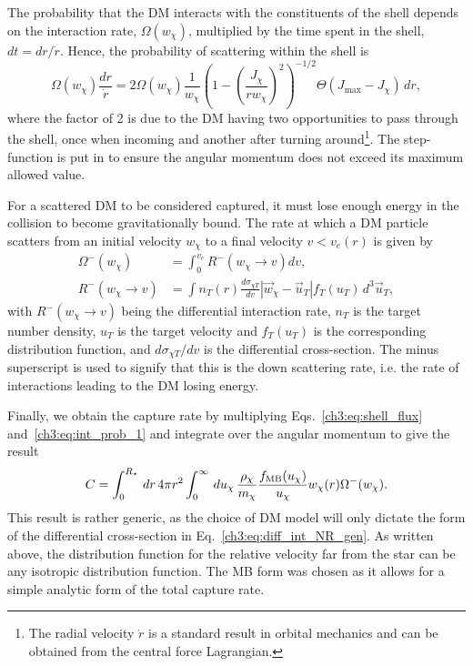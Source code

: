 The probability that the DM interacts with the constituents of the shell depends on the interaction rate, $\Omega(w_\chi)$, multiplied by the time spent in the shell, $dt = dr/\dot r$. Hence, the probability of scattering within the shell is
\begin{equation}
    \Omega(w_\chi) \frac{dr}{\dot r} = 2  \Omega(w_\chi)\frac{1}{w_\chi}\left(1 - \left(\frac{J_\chi}{r w_\chi}\right)^2 \right)^{-1/2} \Theta(J_{\mathrm{max}} - J_\chi)\,dr,\label{ch3:eq:int_prob_1}
\end{equation}
where the factor of 2 is due to the DM having two opportunities to pass through the shell, once when incoming and another after turning around\footnote{The radial velocity $\dot r$ is a standard result in orbital mechanics and can be obtained from the central force Lagrangian.}. The step-function is put in to ensure the angular momentum does not exceed its maximum allowed value. 

For a scattered DM to be considered captured, it must lose enough energy in the collision to become gravitationally bound. The rate at which a DM particle scatters from an initial velocity $w_\chi$ to a final velocity $v<v_e(r)$ is given by~\cite{Gould:1987ju_WeaklyInteractingMassive, Gould:1987ir_ResonantEnhancementsWIMP, Busoni:2017mhe_oct_Evaporationscatteringmomentum}
\begin{align}
    \Omega^{-}(w_\chi) &= \int_0^{v_e} R^-(w_\chi \rightarrow v) dv,\label{ch3:eq:down_rate_1}\\
    R^-(w_\chi \rightarrow v) & = \int n_T(r) \frac{d\sigma_{\chi T}}{dv} |\vec{w}_\chi -\vec{u}_T| f_T(u_T) \,d^3\vec{u}_T, \label{ch3:eq:diff_int_NR_gen}
\end{align}
with $R^-(w_\chi \rightarrow v)$ being the differential interaction rate, $n_T$ is the target number density, $u_T$ is the target velocity and $f_T(u_T)$ is the corresponding distribution function, and $d\sigma_{\chi T}/dv$ is the differential cross-section. The minus superscript is used to signify that this is the down scattering rate, i.e. the rate of interactions leading to the DM losing energy. 

Finally, we obtain the capture rate by multiplying Eqs.~\ref{ch3:eq:shell_flux} and~\ref{ch3:eq:int_prob_1} and integrate over the angular momentum to give the result
\begin{equation}
    C =\int_0^{R_\star} \,dr\, 4\pi r^2 \int_0^\infty\,du_\chi\, \frac{\rho_\chi}{m_\chi} \frac{f_{\rm MB}(u_\chi)}{u_\chi} w_\chi(r)\Omega^-(w_\chi).
\end{equation}
This result is rather generic, as the choice of DM model will only dictate the form of the differential cross-section in  Eq.~\ref{ch3:eq:diff_int_NR_gen}. As written above, the distribution function for the relative velocity far from the star can be any isotropic distribution function. The MB form was chosen as it allows for a simple analytic form of the total capture rate. 

